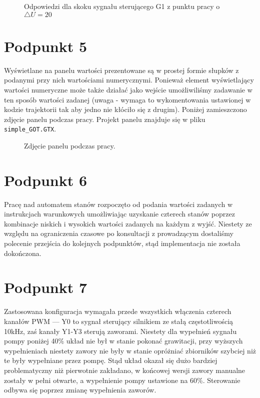 \begin{figure}[ht]
\centering

\caption{Odpowiedzi dla skoku sygnału sterującego G1 z punktu pracy o $\triangle U = 20$}
\label{Z2steps}
\end{figure}


\chapter{Podpunkt 5}
Wyświetlane na panelu wartości prezentowane są w prostej formie słupków z podanymi przy nich wartościami numerycznymi. Ponieważ element wyświetlający wartości numeryczne może także działać jako wejście umożliwiliśmy zadawanie w ten sposób wartości zadanej (uwaga - wymaga to wykomentowania ustawionej w kodzie trajektorii tak aby jedno nie kłóciło się z drugim). Poniżej zamieszczono zdjęcie panelu podczas pracy. Projekt panelu znajduje się w pliku \verb+simple_GOT.GTX+.

\begin{figure}[ht]
\centering

\caption{Zdjęcie panelu podczas pracy.}
\end{figure}

\chapter{Podpunkt 6}
Pracę nad automatem stanów rozpoczęto od podania wartości zadanych w instrukcjach warunkowych umożliwiając uzyskanie czterech stanów poprzez kombinacje niskich i wysokich wartości zadanych na każdym z wyjść. Niestety ze względu na ograniczenia czasowe po konsultacji z prowadzącym dostaliśmy polecenie przejścia do kolejnych podpunktów, stąd implementacja nie została dokończona.

\chapter{Podpunkt 7}
Zastosowana konfiguracja wymagała przede wszystkich włączenia czterech kanałów PWM --- Y0 to sygnał sterujący silnikiem ze stałą częstotliwością 10kHz, zaś kanały Y1-Y3 sterują zaworami. Niestety dla wypełnień sygnału pompy poniżej 40\% układ nie był w stanie pokonać grawitacji, przy wyższych wypełnieniach niestety zawory nie były w stanie opróżniać zbiorników szybciej niż te były wypełniane przez pompę. Stąd układ okazał się dużo bardziej problematyczny niż pierwotnie zakładano, w końcowej wersji zawory manualne zostały w pełni otwarte, a wypełnienie pompy ustawione na 60\%. Sterowanie odbywa się poprzez zmianę wypełnienia zaworów.

